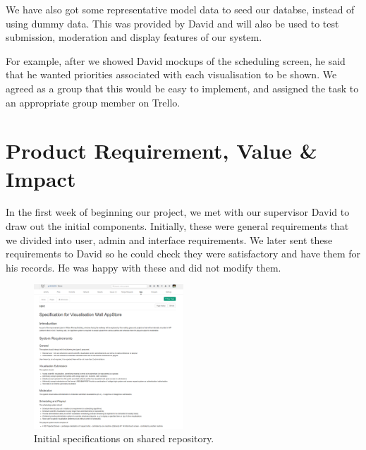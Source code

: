 \documentclass[a4paper]{article}
\begin{document}
We have also got some representative model data to seed our databse, 
instead of using dummy data. This was provided by David and will also be 
used to test submission, moderation and display features of our system.

For example, after we showed David mockups of the scheduling screen, he said that 
he wanted priorities associated with each visualisation to be shown. We agreed as a 
group that this would be easy to implement, and assigned the task to an appropriate
group member on Trello. 


\section{Product Requirement, Value \& Impact}
In the first week of beginning our project, we met with our supervisor 
David to draw out the initial components. Initially, these were general
requirements that we divided into user, admin and interface 
requirements. We later sent these requirements to David so he could check
they were satisfactory and have them for his records. He was happy with 
these and did not modify them.



\begin{figure}[H]
  \centering
    \includegraphics[width = 0.5\textwidth]{./evaluation/specs.png}

  \caption{Initial specifications on shared repository.}
  \label{fig:specs}
\end{figure}
\end{document}
